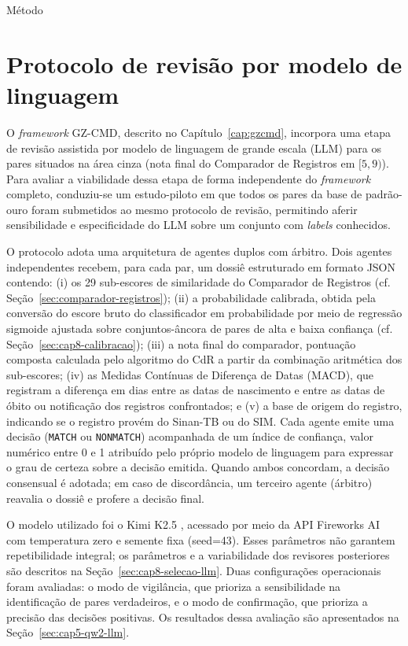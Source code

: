 \begin{chapter}{Método}
\section{Protocolo de revisão por modelo de linguagem}\label{sec:protocolo-llm}

O \textit{framework} GZ-CMD, descrito no Capítulo~\ref{cap:gzcmd}, incorpora uma etapa de revisão assistida por modelo de linguagem de grande escala (LLM) para os pares situados na área cinza (nota final do Comparador de Registros em $[5,9)$). Para avaliar a viabilidade dessa etapa de forma independente do \textit{framework} completo, conduziu-se um estudo-piloto em que todos os pares da base de padrão-ouro foram submetidos ao mesmo protocolo de revisão, permitindo aferir sensibilidade e especificidade do LLM sobre um conjunto com \textit{labels} conhecidos.

O protocolo adota uma arquitetura de agentes duplos com árbitro. Dois agentes independentes recebem, para cada par, um dossiê estruturado em formato JSON contendo: (i) os 29 sub-escores de similaridade do Comparador de Registros (cf. Seção~\ref{sec:comparador-registros}); (ii) a probabilidade calibrada, obtida pela conversão do escore bruto do classificador em probabilidade por meio de regressão sigmoide ajustada sobre conjuntos-âncora de pares de alta e baixa confiança (cf. Seção~\ref{sec:cap8-calibracao}); (iii) a nota final do comparador, pontuação composta calculada pelo algoritmo do CdR a partir da combinação aritmética dos sub-escores; (iv) as Medidas Contínuas de Diferença de Datas (MACD), que registram a diferença em dias entre as datas de nascimento e entre as datas de óbito ou notificação dos registros confrontados; e (v) a base de origem do registro, indicando se o registro provém do Sinan-TB ou do SIM. Cada agente emite uma decisão (\texttt{MATCH} ou \texttt{NONMATCH}) acompanhada de um índice de confiança, valor numérico entre 0 e 1 atribuído pelo próprio modelo de linguagem para expressar o grau de certeza sobre a decisão emitida. Quando ambos concordam, a decisão consensual é adotada; em caso de discordância, um terceiro agente (árbitro) reavalia o dossiê e profere a decisão final.

O modelo utilizado foi o Kimi K2.5 \cite{Fireworks2024}, acessado por meio da API Fireworks AI com temperatura zero e semente fixa (seed=43). Esses parâmetros não garantem repetibilidade integral; os parâmetros e a variabilidade dos revisores posteriores são descritos na Seção~\ref{sec:cap8-selecao-llm}. Duas configurações operacionais foram avaliadas: o modo de vigilância, que prioriza a sensibilidade na identificação de pares verdadeiros, e o modo de confirmação, que prioriza a precisão das decisões positivas. Os resultados dessa avaliação são apresentados na Seção~\ref{sec:cap5-qw2-llm}.


\end{chapter}
